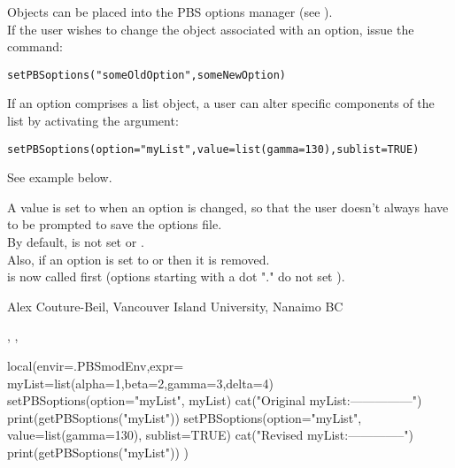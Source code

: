 \documentclass[letterpaper]{book}
\begin{document}
%
\begin{Details}\relax
Objects can be placed into the PBS options manager (see ).\\{}
If the user wishes to change the object associated with an option, issue the command:
\begin{alltt}setPBSoptions("someOldOption",someNewOption)\end{alltt}


If an option comprises a list object, a user can alter specific components of the list 
by activating the  argument:
\begin{alltt}setPBSoptions(option="myList", value=list(gamma=130), sublist=TRUE)\end{alltt}

See example below.
\end{Details}
%
\begin{Note}\relax
A value  is set to  when an option is changed,
so that the user doesn't always have to be prompted to save the options file. \\{}
By default,  is not set or . \\{}
Also, if an option is set to  or  then it is removed. \\{}
 is now called first (options starting with a dot "." 
do not set ).
\end{Note}
%
\begin{Author}\relax
Alex Couture-Beil, Vancouver Island University, Nanaimo BC
\end{Author}
%
\begin{SeeAlso}\relax
{}, ,
\end{SeeAlso}
%
\begin{Examples}
\begin{ExampleCode}
local(envir=.PBSmodEnv,expr={
  myList=list(alpha=1,beta=2,gamma=3,delta=4)
  setPBSoptions(option="myList", myList)
  cat("Original myList:\n---------------\n")
  print(getPBSoptions("myList"))
  setPBSoptions(option="myList", value=list(gamma=130), sublist=TRUE)
  cat("Revised myList:\n--------------\n")
  print(getPBSoptions("myList"))
})
\end{ExampleCode}
\end{Examples}
\end{document}
